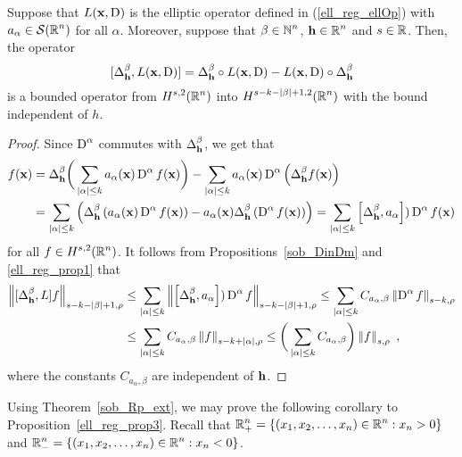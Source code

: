\begin{cor} \label{ell_reg_cor1}
Suppose that $L(\mathbf{x},\operatorname{D})$ is the elliptic operator defined
in (\ref{ell_reg_ellOp}) with $\displaystyle a_\alpha \in \mathcal{S}(\mathbb{R}^n)$
for all $\alpha$.  Moreover, suppose that
$\displaystyle \beta \in \mathbb{N}^n$, $\displaystyle \mathbf{h}\in \mathbb{R}^n$ and
$s \in \mathbb{R}$.  Then, the operator
\[
[\Delta^\beta_{\mathbf{h}}, L(\mathbf{x},\operatorname{D})]
= \Delta^\beta_{\mathbf{h}} \circ L(\mathbf{x},\operatorname{D}) - L(\mathbf{x},\operatorname{D})
\circ \Delta^\beta_{\mathbf{h}}
\]
is a bounded operator from $\displaystyle H^{s,2}(\mathbb{R}^n)$ into
$\displaystyle H^{s-k-|\beta|+1,2}(\mathbb{R}^n)$ with the bound independent of $h$.
\end{cor}

\begin{proof}
Since $\displaystyle \operatorname{D}^\alpha$ commutes with
$\displaystyle \Delta_{\mathbf{h}}^\beta$, we get that
\begin{align*}
[\Delta^\beta_{\VEC{h}}, L] f(\VEC{x}) &=
\Delta^\beta_{\VEC{h}}\bigg(\sum_{|\alpha|\leq k} a_\alpha(\VEC{x})
\diff^\alpha f(\VEC{x}) \bigg) -
\sum_{|\alpha|\leq k} a_\alpha(\VEC{x}) \diff^\alpha
\left(\Delta^\beta_{\VEC{h}} f(\VEC{x}) \right) \\
&= \sum_{|\alpha|\leq k} \left( \Delta^\beta_{\VEC{h}}\left( a_\alpha(\VEC{x})
\diff^\alpha f(\VEC{x}) \right) - a_\alpha(\VEC{x})
\Delta^\beta_{\VEC{h}} \left( \diff^\alpha f(\VEC{x}) \right) \right)
= \sum_{|\alpha|\leq k} \left[ \Delta^\beta_{\VEC{h}}, a_\alpha \right])
\diff^\alpha f(\VEC{x})
\end{align*}
for all $\displaystyle f \in H^{s,2}(\mathbb{R}^n)$.  It follows from
Propositions~\ref{sob_DinDm} and \ref{ell_reg_prop1} that
\begin{align*}
\left\| [\Delta^\beta_{\mathbf{h}}, L] f \right\|_{s-k-|\beta|+1,\rho}
&\leq \sum_{|\alpha|\leq k} \left\|\left[ \Delta^\beta_{\mathbf{h}}, a_\alpha \right])
\operatorname{D}^\alpha f \right\|_{s-k-|\beta|+1,\rho}
\leq \sum_{|\alpha|\leq k} C_{a_\alpha,\beta}
\left\| \operatorname{D}^\alpha f \right\|_{s-k,\rho} \\
&\leq \sum_{|\alpha|\leq k} C_{a_\alpha,\beta}
\left\| f \right\|_{s-k+|\alpha|,\rho}
\leq \bigg( \sum_{|\alpha|\leq k} C_{a_\alpha,\beta}\bigg)
\left\| f \right\|_{s,\rho} \ ,
\end{align*}
where the constants $C_{a_\alpha,\beta}$ are independent of $\mathbf{h}$.
\end{proof}

Using Theorem~\ref{sob_Rp_ext}, we may prove the following corollary
to Proposition~\ref{ell_reg_prop3}.  Recall that
$\displaystyle \mathbb{R}^n_+ = \{ (x_1,x_2,\ldots,x_n) \in \mathbb{R}^n : x_n>0 \}$
and $\displaystyle \mathbb{R}^n_- = \{ (x_1,x_2,\ldots,x_n) \in \mathbb{R}^n : x_n<0 \}$.

